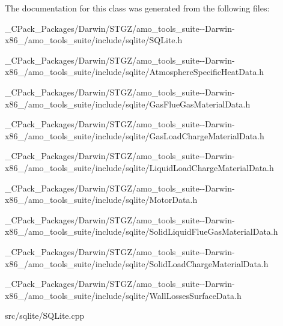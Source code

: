 The documentation for this class was generated from the following files\+:\begin{DoxyCompactItemize}
\item 
\+\_\+\+C\+Pack\+\_\+\+Packages/\+Darwin/\+S\+T\+G\+Z/amo\+\_\+tools\+\_\+suite-\/-\/\+Darwin-\/x86\+\_/amo\+\_\+tools\+\_\+suite/include/sqlite/S\+Q\+Lite.\+h\item 
\+\_\+\+C\+Pack\+\_\+\+Packages/\+Darwin/\+S\+T\+G\+Z/amo\+\_\+tools\+\_\+suite-\/-\/\+Darwin-\/x86\+\_/amo\+\_\+tools\+\_\+suite/include/sqlite/Atmosphere\+Specific\+Heat\+Data.\+h\item 
\+\_\+\+C\+Pack\+\_\+\+Packages/\+Darwin/\+S\+T\+G\+Z/amo\+\_\+tools\+\_\+suite-\/-\/\+Darwin-\/x86\+\_/amo\+\_\+tools\+\_\+suite/include/sqlite/Gas\+Flue\+Gas\+Material\+Data.\+h\item 
\+\_\+\+C\+Pack\+\_\+\+Packages/\+Darwin/\+S\+T\+G\+Z/amo\+\_\+tools\+\_\+suite-\/-\/\+Darwin-\/x86\+\_/amo\+\_\+tools\+\_\+suite/include/sqlite/Gas\+Load\+Charge\+Material\+Data.\+h\item 
\+\_\+\+C\+Pack\+\_\+\+Packages/\+Darwin/\+S\+T\+G\+Z/amo\+\_\+tools\+\_\+suite-\/-\/\+Darwin-\/x86\+\_/amo\+\_\+tools\+\_\+suite/include/sqlite/Liquid\+Load\+Charge\+Material\+Data.\+h\item 
\+\_\+\+C\+Pack\+\_\+\+Packages/\+Darwin/\+S\+T\+G\+Z/amo\+\_\+tools\+\_\+suite-\/-\/\+Darwin-\/x86\+\_/amo\+\_\+tools\+\_\+suite/include/sqlite/Motor\+Data.\+h\item 
\+\_\+\+C\+Pack\+\_\+\+Packages/\+Darwin/\+S\+T\+G\+Z/amo\+\_\+tools\+\_\+suite-\/-\/\+Darwin-\/x86\+\_/amo\+\_\+tools\+\_\+suite/include/sqlite/Solid\+Liquid\+Flue\+Gas\+Material\+Data.\+h\item 
\+\_\+\+C\+Pack\+\_\+\+Packages/\+Darwin/\+S\+T\+G\+Z/amo\+\_\+tools\+\_\+suite-\/-\/\+Darwin-\/x86\+\_/amo\+\_\+tools\+\_\+suite/include/sqlite/Solid\+Load\+Charge\+Material\+Data.\+h\item 
\+\_\+\+C\+Pack\+\_\+\+Packages/\+Darwin/\+S\+T\+G\+Z/amo\+\_\+tools\+\_\+suite-\/-\/\+Darwin-\/x86\+\_/amo\+\_\+tools\+\_\+suite/include/sqlite/Wall\+Losses\+Surface\+Data.\+h\item 
src/sqlite/S\+Q\+Lite.\+cpp\end{DoxyCompactItemize}

